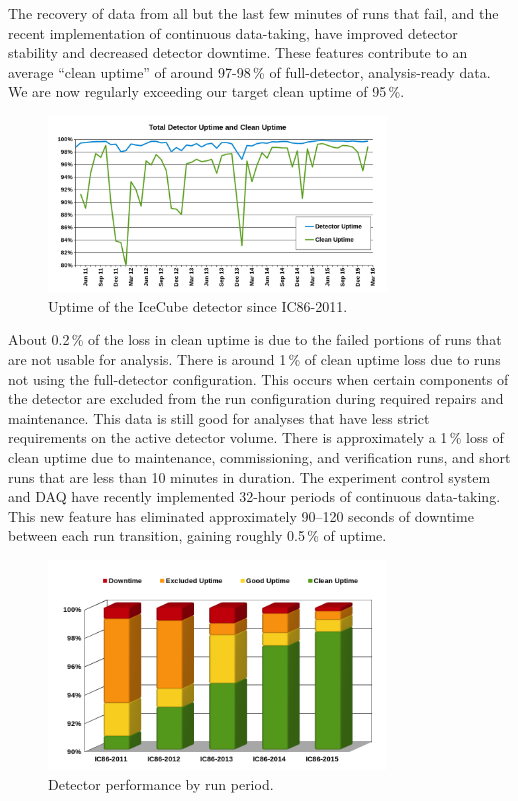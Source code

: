 
The recovery of data from all but the last few minutes of runs that fail, and the recent implementation of continuous data-taking, have improved detector stability and decreased detector downtime. These features contribute to an average “clean uptime” of around 97-98\,\% of full-detector, analysis-ready data. We are now regularly exceeding our target clean uptime of 95\,\%.

\begin{figure}[!h]
 \centering
 \includegraphics[width=0.8\textwidth]{graphics/uptime/clean-uptime.png}
 \caption{Uptime of the IceCube detector since IC86-2011.}
 \label{fig:clean-uptime}
\end{figure}

About 0.2\,\% of the loss in clean uptime is due to the failed portions of runs that are not usable for analysis. There is around 1\,\% of clean uptime loss due to runs not using the full-detector configuration. This occurs when certain components of the detector are excluded from the run configuration during required repairs and maintenance. This data is still good for analyses that have less strict requirements on the active detector volume. There is approximately a 1\,\% loss of clean uptime due to maintenance, commissioning, and verification runs, and short runs that are less than 10 minutes in duration. The experiment control system and DAQ have recently implemented 32-hour periods of continuous data-taking. This new feature has eliminated approximately 90–120 seconds of downtime between each run transition, gaining roughly 0.5\,\% of uptime.

\begin{figure}[!h]
	\centering
	\includegraphics[width=0.8\textwidth]{graphics/uptime/bar-chart.png}
	\caption{Detector performance by run period.}
	\label{fig:period-performace}
\end{figure}


